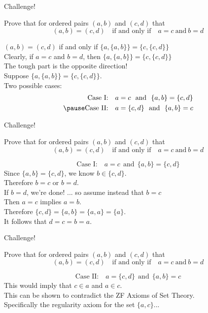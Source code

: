 \documentclass{beamer}
\begin{document}
\begin{frame}{Challenge!}
\begin{prob}
Prove that for ordered pairs $(a,b)$ and $(c,d)$ that
$$(a,b)=(c,d)\quad\text{if and only if}\quad a=c\ \text{and}\ b=d$$
\end{prob}
\pause
\begin{soln}
$(a,b)=(c,d)$ if and only if $\{a,\{a,b\}\}=\{c,\{c,d\}\}$\\
\pause
Clearly, if $a=c$ and $b=d$, then $\{a,\{a,b\}\}=\{c,\{c,d\}\}$\\
\pause
The tough part is the opposite direction!\\
\pause
Suppose $\{a,\{a,b\}\}=\{c,\{c,d\}\}$.\\
\pause
Two possible cases:
\pause
\begin{align*}
\text{Case I:}\quad a=c\ \ \text{and}\ \  \{a,b\} = \{c,d\}\\
\pause
\text{Case II:}\quad a=\{c,d\}\ \ \text{and}\ \ \{a,b\} = c
\end{align*}
\end{soln}
\end{frame}

\begin{frame}{Challenge!}
\begin{prob}
Prove that for ordered pairs $(a,b)$ and $(c,d)$ that
$$(a,b)=(c,d)\quad\text{if and only if}\quad a=c\ \text{and}\ b=d$$
\end{prob}
\begin{soln}
$$\text{Case I:}\quad a=c\ \ \text{and}\ \  \{a,b\} = \{c,d\}$$
\pause
Since $\{a,b\} = \{c,d\}$, we know $b\in \{c,d\}$.\\
\pause
Therefore $b=c$ or $b=d$.\\
If $b=d$, we're done! \pause ... so assume instead that $b=c$\\
\pause
Then $a=c$ implies $a=b$.\\
\pause
Therefore $\{c,d\} = \{a,b\} = \{a,a\} = \{a\}$.\\
\pause
It follows that $d=c=b=a$.
\end{soln}
\end{frame}

\begin{frame}{Challenge!}
\begin{prob}
Prove that for ordered pairs $(a,b)$ and $(c,d)$ that
$$(a,b)=(c,d)\quad\text{if and only if}\quad a=c\ \text{and}\ b=d$$
\end{prob}
\begin{soln}
$$\text{Case II:}\quad a=\{c,d\}\ \ \text{and}\ \ \{a,b\} = c$$
\pause
This would imply that $c\in a$ and $a\in c$.\\
\pause
This can be shown to contradict the ZF Axioms of Set Theory.\\
\pause
Specifically the regularity axiom for the set $\{a,c\}$...
\end{soln}
\end{frame}
\end{document}
